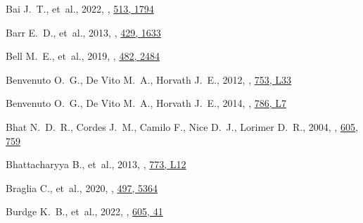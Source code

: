 \documentclass[fleqn,usenatbib]{mnras}
\begin{document}
\begin{thebibliography}{99}
{Bai} J.~T.,  et~al., 2022, , \href {https://ui.adsabs.harvard.edu/abs/2022MNRAS.513.1794B} {513, 1794}

{Barr} E.~D.,  et~al., 2013, , \href {https://ui.adsabs.harvard.edu/abs/2013MNRAS.429.1633B} {429, 1633}

{Bell} M.~E.,  et~al., 2019, , \href {https://ui.adsabs.harvard.edu/abs/2019MNRAS.482.2484B} {482, 2484}

{Benvenuto} O.~G.,  {De Vito} M.~A.,   {Horvath} J.~E.,  2012, , \href {https://ui.adsabs.harvard.edu/abs/2012ApJ...753L..33B} {753, L33}

{Benvenuto} O.~G.,  {De Vito} M.~A.,   {Horvath} J.~E.,  2014, , \href {https://ui.adsabs.harvard.edu/abs/2014ApJ...786L...7B} {786, L7}

{Bhat} N.~D.~R.,  {Cordes} J.~M.,  {Camilo} F.,  {Nice} D.~J.,   {Lorimer} D.~R.,  2004, , \href {https://ui.adsabs.harvard.edu/abs/2004ApJ...605..759B} {605, 759}

{Bhattacharyya} B.,  et~al., 2013, , \href {https://ui.adsabs.harvard.edu/abs/2013ApJ...773L..12B} {773, L12}

{Braglia} C.,  et~al., 2020, , \href {https://ui.adsabs.harvard.edu/abs/2020MNRAS.497.5364B} {497, 5364}

{Burdge} K.~B.,  et~al., 2022, , \href {https://ui.adsabs.harvard.edu/abs/2022Natur.605...41B} {605, 41}


\end{thebibliography}
\end{document}

